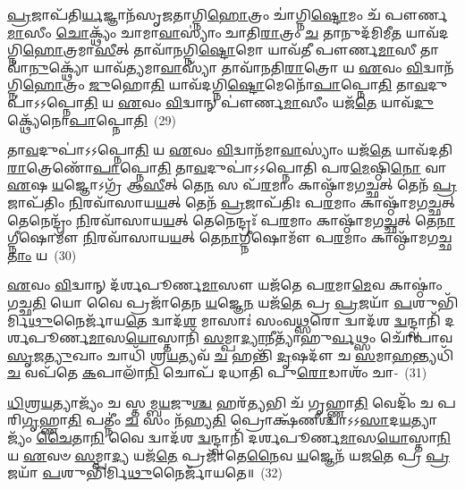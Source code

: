 \-\ul{𑌪𑍍𑌰}\-𑌜𑌾𑌪᳴𑌤𑌿\-\ul{𑌰𑍍𑌯}\-𑌜𑍍𑌞𑌾𑌨᳴𑌸𑍃𑌜𑌤𑌾𑌗𑍍𑌨𑌿\-\ul{𑌹𑍋}\-𑌤𑍍𑌰𑌂 𑌚𑌾॑𑌗𑍍𑌨𑌿\-\ul{𑌷𑍍𑌟𑍋}\-𑌮𑌂 𑌚᳴ 𑌪𑍗𑌰𑍍𑌣\-\ul{𑌮𑌾}\-𑌸𑍀𑌂 \ul{𑌚𑍋}\-𑌕𑍍𑌥𑍍𑌯𑌂᳴ 𑌚𑌾𑌮𑌾\-\ul{𑌵𑌾}\-𑌸𑍍𑌯𑌾𑌂॑ 𑌚𑌾𑌤𑌿\-\ul{𑌰𑌾}\-𑌤𑍍𑌰𑌂 \ul{𑌚} 𑌤𑌾𑌨𑍁𑌦᳴𑌮𑌿𑌮𑍀\-\ul{𑌤} 𑌯𑌾𑌵᳴𑌦𑌗𑍍𑌨𑌿\-\ul{𑌹𑍋}\-𑌤𑍍𑌰𑌮𑌾\-\ul{𑌸𑍀}\-𑌤𑍍 𑌤𑌾𑌵𑌾᳴𑌨𑌗𑍍𑌨𑌿\-\ul{𑌷𑍍𑌟𑍋}\-𑌮𑍋 𑌯𑌾𑌵᳴𑌤𑍀 𑌪𑍗𑌰𑍍𑌣\-\ul{𑌮𑌾}\-𑌸𑍀 𑌤𑌾𑌵𑌾᳴\-\ul{𑌨𑍁}\-𑌕𑍍𑌥𑍍𑌯𑍋᳴ 𑌯𑌾𑌵᳴𑌤𑍍𑌯𑌮𑌾\-\ul{𑌵𑌾}\-𑌸𑍍𑌯𑌾᳴ 𑌤𑌾𑌵𑌾᳴𑌨𑌤𑌿\-\ul{𑌰𑌾}\-𑌤𑍍𑌰𑍋 𑌯 \ul{𑌏}\-𑌵𑌂 \ul{𑌵𑌿}\-𑌦𑍍𑌵𑌾𑌨᳴𑌗𑍍𑌨𑌿\-\ul{𑌹𑍋}\-𑌤𑍍𑌰𑌂 \ul{𑌜𑍁}\-𑌹𑍋\-\ul{𑌤𑌿} 𑌯𑌾𑌵᳴𑌦𑌗𑍍𑌨𑌿\-\ul{𑌷𑍍𑌟𑍋}\-𑌮𑍇𑌨𑍋᳴\-\ul{𑌪𑌾}\-𑌪𑍍𑌨𑍋\-\ul{𑌤𑌿} 𑌤𑌾\-\ul{𑌵}\-𑌦𑍁𑌪𑌾॑\-𑌽\-𑌽𑌪𑍍𑌨𑍋\-\ul{𑌤𑌿} 𑌯 \ul{𑌏}\-𑌵𑌂 \ul{𑌵𑌿}\-𑌦𑍍𑌵𑌾𑌨𑍍 𑌪𑍗॑𑌰𑍍𑌣\-\ul{𑌮𑌾}\-𑌸𑍀𑌂 𑌯𑌜᳴\-\ul{𑌤𑍇} 𑌯𑌾𑌵᳴\-\ul{𑌦𑍁}\-𑌕𑍍𑌥𑍍𑌯𑍇᳴𑌨𑍋\-\ul{𑌪𑌾}\-𑌪𑍍𑌨𑍋\-\ul{𑌤𑌿}\-~(29)

𑌤𑌾\-\ul{𑌵}\-𑌦𑍁𑌪𑌾॑\-𑌽\-𑌽𑌪𑍍𑌨𑍋\-\ul{𑌤𑌿} 𑌯 \ul{𑌏}\-𑌵𑌂 \ul{𑌵𑌿}\-𑌦𑍍𑌵𑌾𑌨᳴𑌮𑌾\-\ul{𑌵𑌾}\-𑌸𑍍𑌯𑌾𑌂॑ 𑌯𑌜᳴\-\ul{𑌤𑍇} 𑌯𑌾𑌵᳴𑌦𑌤𑌿\-\ul{𑌰𑌾}\-𑌤𑍍𑌰𑍇𑌣𑍋᳴\-\ul{𑌪𑌾}\-𑌪𑍍𑌨𑍋\-\ul{𑌤𑌿} 𑌤𑌾\-\ul{𑌵}\-𑌦𑍁𑌪𑌾॑\-𑌽\-𑌽𑌪𑍍𑌨𑍋𑌤𑌿 𑌪𑌰\-\ul{𑌮𑍇}\-𑌷𑍍𑌠𑌿\-\ul{𑌨𑍋} 𑌵𑌾 \ul{𑌏}\-𑌷 \ul{𑌯}\-𑌜𑍍𑌞𑍋\-𑌽𑌗𑍍𑌰᳴ 𑌆\-\ul{𑌸𑍀}\-𑌤𑍍 𑌤𑍇\-\ul{𑌨} 𑌸 𑌪᳴\-\ul{𑌰}\-𑌮𑌾𑌂 𑌕𑌾𑌷𑍍𑌠𑌾᳴𑌮𑌗\-\ul{𑌚𑍍𑌛}\-𑌤𑍍 𑌤𑍇𑌨᳴ \ul{𑌪𑍍𑌰}\-𑌜𑌾𑌪᳴𑌤𑌿𑌂 \ul{𑌨𑌿}\-𑌰𑌵𑌾᳴𑌸𑌾𑌯\-\ul{𑌯}\-𑌤𑍍 𑌤𑍇𑌨᳴ \ul{𑌪𑍍𑌰}\-𑌜𑌾𑌪᳴𑌤𑌿𑌃 𑌪\-\ul{𑌰}\-𑌮𑌾𑌂 𑌕𑌾𑌷𑍍𑌠𑌾᳴𑌮𑌗\-\ul{𑌚𑍍𑌛}\-𑌤𑍍 𑌤𑍇𑌨𑍇𑌨𑍍𑌦𑍍𑌰𑌂᳴ \ul{𑌨𑌿}\-𑌰𑌵𑌾᳴𑌸𑌾𑌯\-\ul{𑌯}\-𑌤𑍍 𑌤𑍇𑌨𑍇𑌨𑍍𑌦𑍍𑌰𑌃᳴ 𑌪\-\ul{𑌰}\-𑌮𑌾𑌂 𑌕𑌾𑌷𑍍𑌠𑌾᳴𑌮𑌗\-\ul{𑌚𑍍𑌛}\-𑌤𑍍 𑌤𑍇\-\ul{𑌨𑌾}\-𑌗𑍍𑌨𑍀𑌷𑍋𑌮𑍗᳴ \ul{𑌨𑌿}\-𑌰𑌵𑌾᳴𑌸𑌾𑌯\-\ul{𑌯}\-𑌤𑍍 𑌤𑍇\-\ul{𑌨𑌾}\-𑌗𑍍𑌨𑍀𑌷𑍋𑌮𑍗᳴ 𑌪\-\ul{𑌰}\-𑌮𑌾𑌂 𑌕𑌾𑌷𑍍𑌠𑌾᳴𑌮𑌗𑌚𑍍𑌛\-\ul{𑌤𑌾𑌂} 𑌯~(30)

\-\ul{𑌏}\-𑌵𑌂 \ul{𑌵𑌿}\-𑌦𑍍𑌵𑌾𑌨𑍍 𑌦᳴𑌰𑍍\mbox{}𑌶𑌪𑍂𑌰𑍍𑌣\-\ul{𑌮𑌾}\-𑌸𑍗 𑌯𑌜᳴𑌤𑍇 𑌪\-\ul{𑌰}\-𑌮𑌾\-\ul{𑌮𑍇}\-𑌵 𑌕𑌾𑌷𑍍𑌠𑌾𑌂॑ 𑌗𑌚𑍍𑌛\-\ul{𑌤𑌿} 𑌯𑍋 𑌵𑍈 𑌪𑍍𑌰𑌜𑌾᳴𑌤𑍇𑌨 \ul{𑌯}\-𑌜𑍍𑌞𑍇\-\ul{𑌨} 𑌯𑌜᳴\-\ul{𑌤𑍇} 𑌪𑍍𑌰 \ul{𑌪𑍍𑌰}\-𑌜𑌯𑌾᳴ \ul{𑌪}\-𑌶𑍁𑌭𑌿᳴𑌰𑍍𑌮𑌿\-\ul{𑌥𑍁}\-𑌨𑍈𑌰𑍍𑌜𑌾᳴𑌯\-\ul{𑌤𑍇} 𑌦𑍍𑌵𑌾𑌦᳴\-\ul{𑌶} 𑌮𑌾𑌸𑌾𑌃॑ 𑌸𑌂𑌵\-\ul{𑌥𑍍𑌸}\-𑌰𑍋 𑌦𑍍𑌵𑌾𑌦᳴𑌶 \ul{𑌦𑍍𑌵}\-𑌨𑍍𑌦𑍍𑌵𑌾𑌨𑌿᳴ 𑌦𑌰𑍍\mbox{}𑌶𑌪𑍂𑌰𑍍𑌣\-\ul{𑌮𑌾}\-𑌸\-\ul{𑌯𑍋}\-𑌸𑍍𑌤𑌾𑌨𑌿᳴ \ul{𑌸}\-𑌮𑍍𑌪𑌾\-\ul{𑌦𑍍𑌯𑌾}\-𑌨𑍀𑌤𑍍𑌯𑌾᳴𑌹𑍁\-\ul{𑌰𑍍𑌵}\-𑌥𑍍𑌸𑌂 𑌚𑍋᳴𑌪𑌾𑌵\-\ul{𑌸𑍃}\-𑌜\-\ul{𑌤𑍍𑌯𑍁}\-𑌖𑌾𑌂 𑌚𑌾𑌧𑌿᳴ 𑌶𑍍𑌰\-\ul{𑌯}\-𑌤𑍍𑌯𑌵᳴ \ul{𑌚} 𑌹𑌨𑍍𑌤𑌿᳴ \ul{𑌦𑍃}\-𑌷𑌦𑍗᳴ 𑌚 \ul{𑌸}\-𑌮𑌾\-\ul{𑌹}\-𑌨𑍍𑌤𑍍𑌯𑌧𑌿᳴ \ul{𑌚} 𑌵𑌪᳴𑌤𑍇 \ul{𑌕}\-𑌪𑌾𑌲𑌾᳴\-\ul{𑌨𑌿} 𑌚𑍋𑌪᳴ 𑌦𑌧𑌾𑌤𑌿 𑌪𑍁\-\ul{𑌰𑍋}\-𑌡𑌾𑌶𑌂᳴ 𑌚𑌾-~(31)

\-\ul{𑌧𑌿}\-𑌶𑍍𑌰\-\ul{𑌯}\-𑌤𑍍𑌯𑌾𑌜𑍍𑌯𑌂᳴ 𑌚 𑌸𑍍𑌤𑌮𑍍𑌬\-\ul{𑌯}\-𑌜𑍁\-\ul{𑌶𑍍𑌚} 𑌹𑌰᳴\-\ul{𑌤𑍍𑌯}\-𑌭𑌿 𑌚᳴ 𑌗𑍃𑌹𑍍𑌣𑌾\-\ul{𑌤𑌿} 𑌵𑍇𑌦𑌿𑌂᳴ 𑌚 𑌪𑌰𑌿\-\ul{𑌗𑍃}\-𑌹𑍍𑌣𑌾\-\ul{𑌤𑌿} 𑌪𑌤𑍍𑌨𑍀𑌂॑ \ul{𑌚} 𑌸𑌂 𑌨᳴𑌹𑍍𑌯\-\ul{𑌤𑌿} 𑌪𑍍𑌰𑍋𑌕𑍍𑌷᳴𑌣𑍀𑌶𑍍𑌚𑌾\-𑌽\-𑌽\-\ul{𑌸𑌾}\-𑌦\-\ul{𑌯}\-𑌤𑍍𑌯𑌾𑌜𑍍𑌯𑌂᳴ \ul{𑌚𑍈}\-𑌤𑌾\-\ul{𑌨𑌿} 𑌵𑍈 𑌦𑍍𑌵𑌾𑌦᳴𑌶 \ul{𑌦𑍍𑌵}\-𑌨𑍍𑌦𑍍𑌵𑌾𑌨𑌿᳴ 𑌦𑌰𑍍\mbox{}𑌶𑌪𑍂𑌰𑍍𑌣\-\ul{𑌮𑌾}\-𑌸\-\ul{𑌯𑍋}\-𑌸𑍍𑌤𑌾\-\ul{𑌨𑌿} 𑌯 \ul{𑌏}\-𑌵𑍞 \ul{𑌸}\-𑌮𑍍𑌪𑌾\-\ul{𑌦𑍍𑌯} 𑌯𑌜᳴\-\ul{𑌤𑍇} 𑌪𑍍𑌰𑌜𑌾᳴𑌤𑍇\-\ul{𑌨𑍈}\-𑌵 \ul{𑌯}\-𑌜𑍍𑌞𑍇𑌨᳴ 𑌯𑌜\-\ul{𑌤𑍇} 𑌪𑍍𑌰 \ul{𑌪𑍍𑌰}\-𑌜𑌯𑌾᳴ \ul{𑌪}\-𑌶𑍁𑌭𑌿᳴𑌰𑍍𑌮𑌿\-\ul{𑌥𑍁}\-𑌨𑍈𑌰𑍍𑌜𑌾᳴𑌯𑌤𑍇॥~(32)

{\anuvakamend[{\-\ul{𑌉}\-𑌕𑍍𑌥𑍍𑌯𑍇᳴𑌨𑍋\-\ul{𑌪𑌾}\-𑌪𑍍𑌨𑍋𑌤𑍍𑌯᳴𑌗𑌚𑍍𑌛\-\ul{𑌤𑌾𑌂} 𑌯𑌃 𑌪𑍁᳴\-\ul{𑌰𑍋}\-𑌡𑌾𑌶𑌂᳴ 𑌚 𑌚𑌤𑍍𑌵𑌾\-\ul{𑌰𑌿}\-\-\ul{𑍞}\-𑌶𑌚𑍍𑌚᳴}]}%

